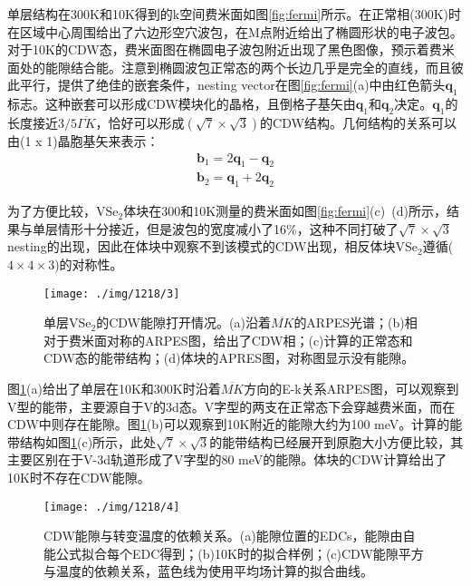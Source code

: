 \documentclass[reprint, aps, prb, showkeys]{revtex4-2}
\begin{document}
单层结构在300K和10K得到的k空间费米面如图\ref{fig:fermi}所示。在正常相(300K)时在区域中心周围给出了六边形空穴波包，在M点附近给出了椭圆形状的电子波包。对于10K的CDW态，费米面图在椭圆电子波包附近出现了黑色图像，预示着费米面处的能隙结合能。注意到椭圆波包正常态的两个长边几乎是完全的直线，而且彼此平行，提供了绝佳的嵌套条件，nesting vector在图\ref{fig:fermi}(a)中由红色箭头$\boldsymbol{q}_1$标志。这种嵌套可以形成CDW模块化的晶格，且倒格子基矢由$\boldsymbol{q}_1$和$\boldsymbol{q}_2$决定。$\boldsymbol{q}_1$的长度接近$3/5 \overline{\Gamma K}$，恰好可以形成$(\sqrt{7} \times \sqrt{3})$的CDW结构。几何结构的关系可以由(1 x 1)晶胞基矢来表示：
\begin{eqnarray}
    \boldsymbol{b}_1 = 2\boldsymbol{q}_1 - \boldsymbol{q}_2 \nonumber\\
    \boldsymbol{b}_2 = \boldsymbol{q}_1 + 2\boldsymbol{q}_2
\end{eqnarray}

为了方便比较，VSe$_2$体块在300和10K测量的费米面如图\ref{fig:fermi}(c)~(d)所示，结果与单层情形十分接近，但是波包的宽度减小了16\%，这种不同打破了$\sqrt{7} \times \sqrt{3}$nesting的出现，因此在体块中观察不到该模式的CDW出现，相反体块VSe$_2$遵循($4 \times 4 \times 3$)的对称性。
\begin{figure}[t]
    \texttt{[image: ./img/1218/3]}
    \caption{\label{fig:gap} 
    单层VSe$_2$的CDW能隙打开情况。(a)沿着$\overline{MK}$的ARPES光谱；(b)相对于费米面对称的ARPES图，给出了CDW相；(c)计算的正常态和CDW态的能带结构；(d)体块的APRES图，对称图显示没有能隙。
    }
\end{figure}

图\ref{fig:gap}(a)给出了单层在10K和300K时沿着$\overline{MK}$方向的E-k关系ARPES图，可以观察到V型的能带，主要源自于V的3d态。V字型的两支在正常态下会穿越费米面，而在CDW中则存在能隙。图\ref{fig:gap}(b)可以观察到10K附近的能隙大约为100 meV。计算的能带结构如图\ref{fig:gap}(c)所示，此处$\sqrt{7} \times \sqrt{3}$的能带结构已经展开到原胞大小方便比较，其主要区别在于V-3d轨道形成了V字型的80 meV的能隙。体块的CDW计算给出了10K时不存在CDW能隙。
\begin{figure}[b]
    \texttt{[image: ./img/1218/4]}
    \caption{\label{fig:temperature} 
    CDW能隙与转变温度的依赖关系。(a)能隙位置的EDCs，能隙由自能公式拟合每个EDC得到；(b)10K时的拟合样例；(c)CDW能隙平方与温度的依赖关系，蓝色线为使用平均场计算的拟合曲线。
    }
\end{figure}
\end{document}
